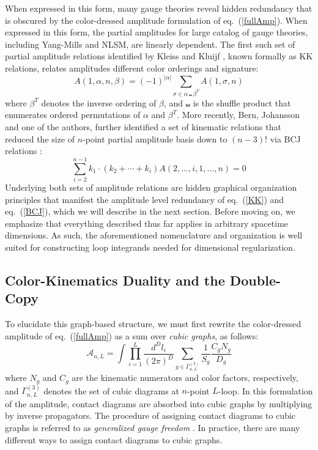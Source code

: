 \documentclass[12pt,letter]{article}
\def\eqn#1{eq.~(\ref{#1})}
\def\be{\begin{equation}}
\def\ee{\end{equation}}
\begin{document}
When expressed in this form, many gauge theories reveal hidden redundancy that is obscured by the color-dressed amplitude formulation of \eqn{fullAmp}. When expressed in this form, the partial amplitudes for large catalog \cite{BCJreview} of gauge theories, including Yang-Mills and NLSM, are linearly dependent. The first such set of partial amplitude relations identified by Kleiss and Kluijf \cite{KK}, known formally as KK relations, relates amplitudes different color orderings and signature:
\be\label{KK}
A(1,\alpha,n,\beta)=(-1)^{|\alpha|}\sum_{\sigma\in \alpha \shuffle \beta^T} A(1,\sigma,n)
\ee
where $\beta^T$ denotes the inverse ordering of $\beta$, and $\shuffle$ is the shuffle product that enumerates ordered permutations of $\alpha$ and $\beta^T$. More recently, Bern, Johansson and one of the authors, further identified a set of kinematic relations that reduced the size of $n$-point partial amplitude basis down to $(n-3)!$ via BCJ relations \cite{BCJ}:
\be\label{BCJ}
\sum_{i=2}^{n-1}k_1\cdot(k_2+\cdots +k_i) A(2,...,i,1,...,n)=0
\ee
Underlying both sets of amplitude relations are hidden graphical organization principles that manifest the amplitude level redundancy of \eqn{KK} and \eqn{BCJ}, which we will describe in the next section. Before moving on, we emphasize that everything described thus far applies in arbitrary spacetime dimensions. As such, the aforementioned nomenclature and organization is well suited for constructing loop integrands needed for dimensional regularization.
\label{subsec:AmpReview}

\subsection{Color-Kinematics Duality and the Double-Copy}
\label{subsec:DCReview}
To elucidate this graph-based structure, we must first rewrite the color-dressed amplitude of \eqn{fullAmp} as a sum over \textit{cubic graphs}, as follows:
\be\label{fullAmpCubic}
\mathcal{A}_{n,L} = \int \prod_{i=1}^L\frac{d^D l_i}{(2\pi)^D} \sum_{g\in \Gamma^{(3)}_{n,L}} \frac{1}{S_g}\frac{C_gN_g}{D_g}
\ee
where $N_g$ and $C_g$ are the kinematic numerators and color factors, respectively, and $ \Gamma^{(3)}_{n,L}$ denotes the set of cubic diagrams at $n$-point $L$-loop. In this formulation of the amplitude, contact diagrams are absorbed into cubic graphs by multiplying by inverse propagators. The procedure of assigning contact diagrams to cubic graphs is referred to as \textit{generalized gauge freedom} \cite{BCJ}. In practice, there are many different ways to assign contact diagrams to cubic graphs. 
\end{document}

